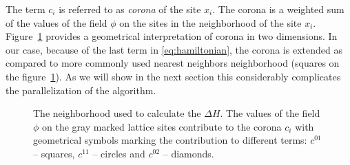 \documentclass[a4paper]{llncs}
\def\bksize{8}
\def\lcsize{5}
\begin{document}
The term $c_i$ is referred to as \emph{corona} of the site $x_i$. The corona is
a weighted sum of the values of the field $\phi$ on the sites in the
neighborhood of the site $x_i$. Figure~\ref{fig:nn} provides a geometrical
interpretation of corona in two dimensions. In our case, because of the last
term in \eqref{eq:hamiltonian}, the corona is extended as compared to more
commonly used nearest neighbors neighborhood (squares on the
figure~\ref{fig:nn}). As we will show in the next section this considerably
complicates the parallelization of the algorithm.

\begin{figure}[H]
\begin{center}
\end{center}
\caption{\label{fig:nn}The neighborhood used to calculate the $\Delta
  H$. The values of the field $\phi$ on the gray marked lattice sites
  contribute to the corona $c_i$ with geometrical symbols marking the
  contribution to different terms: $c^{01}$ -- squares, $c^{11}$ --
  circles and $c^{02}$ -- diamonds.}
\end{figure}

\end{document}
